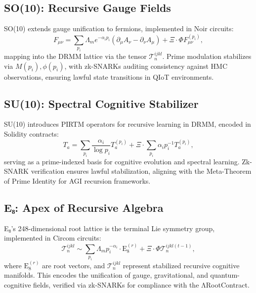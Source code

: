 \documentclass{article}
\theoremstyle{plain}
\begin{document}
\subsection{SO(10): Recursive Gauge Fields}
SO(10) extends gauge unification to fermions, implemented in Noir circuits:
\begin{equation}
F_{\mu\nu} = \sum_{p_i} \Lambda_m e^{-\alpha_i p_i} (\partial_\mu A_\nu - \partial_\nu A_\mu) + \Xi \cdot \Phi F_{\mu\nu}^{(p_i)},
\end{equation}
mapping into the DRMM lattice via the tensor \(\mathcal{T}_n^{ijkl}\). Prime modulation stabilizes via \(M(p_i), \phi(p_i)\), with zk-SNARKs auditing consistency against HMC observations, ensuring lawful state transitions in QIoT environments.

\subsection{SU(10): Spectral Cognitive Stabilizer}
SU(10) introduces PIRTM operators for recursive learning in DRMM, encoded in Solidity contracts:
\begin{equation}
T_a = \sum_{p_i} \frac{\alpha_i}{\log p_i} T_a^{(p_i)} + \Xi \cdot \sum_{p_i} \alpha_i p_i^{-1} T_a^{(p_i)},
\end{equation}
serving as a prime-indexed basis for cognitive evolution and spectral learning. Zk-SNARK verification ensures lawful stabilization, aligning with the Meta-Theorem of Prime Identity for AGI recursion frameworks.

\subsection{E₈: Apex of Recursive Algebra}
E₈’s 248-dimensional root lattice is the terminal Lie symmetry group, implemented in Circom circuits:
\begin{equation}
\mathcal{T}_n^{ijkl} \sim \sum_{p_i} \Lambda_m p_i^{-\alpha_i} \cdot \text{E}_8^{(r)} + \Xi \cdot \Phi \mathcal{T}_n^{ijkl(t-1)},
\end{equation}
where \(\text{E}_8^{(r)}\) are root vectors, and \(\mathcal{T}_n^{ijkl}\) represent stabilized recursive cognitive manifolds. This encodes the unification of gauge, gravitational, and quantum-cognitive fields, verified via zk-SNARKs for compliance with the ΛRootContract.
\end{document}
